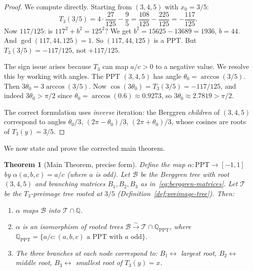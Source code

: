 \documentclass[12pt]{amsart}
\newtheorem{theorem}{Theorem}[section]
\theoremstyle{definition}
\theoremstyle{remark}
\newcommand{\QQ}{\mathbb{Q}}
\renewcommand{\gcd}{\operatorname{gcd}}
\newcommand{\PPT}{\mathrm{PPT}}
\begin{document}
\begin{proof}
We compute directly.  Starting from $(3,4,5)$ with $x_0 = 3/5$:
\[
  T_3(3/5) = 4\cdot\frac{27}{125} - \frac{9}{5}
           = \frac{108}{125} - \frac{225}{125}
           = -\frac{117}{125}.
\]
Now $117/125$: is $117^2 + b^2 = 125^2$?  We get $b^2 = 15625-13689=1936$,
$b=44$.  And $\gcd(117,44,125) = 1$.  So $(117,44,125)$ is a PPT.
But $T_3(3/5) = -117/125$, not $+117/125$.

The sign issue arises because $T_3$ can map $a/c>0$ to a negative value.
We resolve this by working with angles.  The PPT $(3,4,5)$ has angle
$\theta_0 = \arccos(3/5)$.  Then $3\theta_0 = 3\arccos(3/5)$.
Now $\cos(3\theta_0) = T_3(3/5) = -117/125$, and indeed
$3\theta_0 > \pi/2$ since $\theta_0 = \arccos(0.6) \approx 0.9273$,
so $3\theta_0 \approx 2.7819 > \pi/2$.

The correct formulation uses \emph{inverse} iteration: the Berggren
\emph{children} of $(3,4,5)$ correspond to angles $\theta_0/3$,
$(2\pi-\theta_0)/3$, $(2\pi+\theta_0)/3$, whose cosines are roots
of $T_3(y) = 3/5$.
\end{proof}

We now state and prove the corrected main theorem.

\begin{theorem}[Main Theorem, precise form]\label{thm:main-proof}
Define the map $\alpha\colon\PPT \to [-1,1]$ by
$\alpha(a,b,c) = a/c$ (where $a$ is odd).
Let $\mathcal{B}$ be the Berggren tree with root $(3,4,5)$ and branching
matrices $B_1, B_2, B_3$ as in~\eqref{eq:berggren-matrices}.
Let $\mathcal{T}$ be the $T_3$-preimage tree rooted at $3/5$
(Definition~\ref{def:preimage-tree}).  Then:
\begin{enumerate}[label=(\roman*)]
  \item $\alpha$ maps $\mathcal{B}$ into $\mathcal{T}\cap\QQ$.
  \item $\alpha$ is an isomorphism of rooted trees
        $\mathcal{B}\xrightarrow{\sim}\mathcal{T}\cap\QQ_{\PPT}$, where
        $\QQ_{\PPT} = \{a/c : (a,b,c) \text{ a PPT with } a \text{ odd}\}$.
  \item The three branches at each node correspond to:
        $B_1\leftrightarrow$ largest root, $B_2\leftrightarrow$ middle root,
        $B_3\leftrightarrow$ smallest root of $T_3(y)=x$.
\end{enumerate}
\end{theorem}
\end{document}
